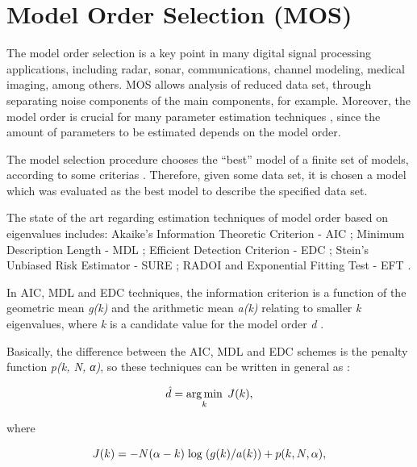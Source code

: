 \documentclass{bmcart}
\DeclareMathOperator*{\argmin}{arg\,min}
\begin{document}
\appendix

\section{Model Order Selection (MOS)}
\label{sec:mos}
The model order selection is a key point in many digital signal processing applications, including radar, sonar, communications, channel modeling, medical imaging, among others. MOS allows analysis of reduced data set, through separating noise components of the main components, for example. Moreover, the model order is crucial for many parameter estimation techniques \cite{da2009comparison}, since the amount of parameters to be estimated depends on the model order.

The model selection procedure chooses the ``best'' model of a finite set of models, according to some criterias \cite{rajan1997model}. Therefore, given some data set, it is chosen a model which was evaluated as the best model to describe the specified data set.

The state of the art regarding estimation techniques of model order based on eigenvalues includes: Akaike's Information Theoretic Criterion - AIC \cite{akaike1974new,wax1985detection}; Minimum Description Length - MDL \cite{barron1998minimum,wax1985detection}; Efficient Detection Criterion - EDC \cite{zhao1986detection}; Stein's Unbiased Risk Estimator - SURE \cite{ulfarsson2008rank}; RADOI \cite{radoi2004new} and Exponential Fitting Test - EFT \cite{grouffaud1996some,quinlan2006model,david2011blind}.

In AIC, MDL and EDC techniques, the information criterion is a function of the geometric mean \emph{g(k)} and the arithmetic mean \emph{a(k)} relating to smaller \emph{k} eigenvalues, where \emph{k} is a candidate value for the model order \emph{d} \cite{da2009comparison}.

Basically, the difference between the AIC, MDL and EDC schemes is the penalty function \emph{p(k, N, α)}, so these techniques can be written in general as \cite{da2009comparison}:

\begin{equation}\label{eq:eq1}
\hat{d} = \argmin\limits_k \hspace{1 mm} J(k), 
\end{equation}

where

\begin{equation}\label{eq:eq2}
J(k) = -N(\alpha - k) \hspace{1 mm} {\rm log} \hspace{1 mm} (g(k)/a(k)) + p(k,N,\alpha),
\end{equation}
\end{document}
